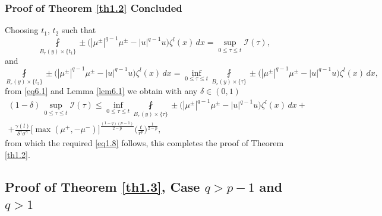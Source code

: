 \documentclass[a4paper,11pt,fullpage]{article}
\numberwithin{equation}{section}
\begin{document}
\subsubsection{Proof of Theorem \ref{th1.2} Concluded}
Choosing $t_1$, $t_2$ such that
$$\fint\limits_{B_{ r}(y)\times\{t_1\}}\pm\big(|\mu^{\pm}|^{q-1}\mu^{\pm}-|u|^{q-1}u\big)\zeta^l(x)\,dx=\sup\limits_{0\leqslant \tau\leqslant t}\mathcal{I}(\tau),$$
and
$$\fint\limits_{B_{r}(y)\times\{t_2\}}\pm\big(|\mu^{\pm}|^{q-1}\mu^{\pm}-|u|^{q-1}u\big)\zeta^l(x)\,dx=
\inf\limits_{0\leqslant \tau\leqslant t}\fint\limits_{B_{r}(y)\times\{\tau\}}\pm\big(|\mu^{\pm}|^{q-1}\mu^{\pm}-|u|^{q-1}u\big)\zeta^l(x)\,dx,$$
from \eqref{eq6.1} and Lemma \ref{lem6.1} we obtain with any $\delta \in (0, 1)$
\begin{multline*}
(1-\delta)\,\sup\limits_{0\leqslant \tau\leqslant t}\mathcal{I}(\tau)\leqslant \inf\limits_{0\leqslant \tau\leqslant t}\fint\limits_{B_{r}(y)\times\{\tau\}}\pm\big(|\mu^{\pm}|^{q-1}\mu^{\pm}-|u|^{q-1}u\big)\zeta^l(x)\,dx+\\+
\frac{\gamma(l)}{\delta^\gamma \sigma^\gamma}
\big[\max(\mu^+, -\mu^-)\big]^{\frac{(1-q)(p-1)}{2-p}}
\Big(\frac{t}{r^p}\Big)^{\frac{1}{2-p}},
\end{multline*}
from which  the required \eqref{eq1.8} follows, this completes the proof of Theorem \ref{th1.2}.


\subsection{Proof of Theorem \ref{th1.3}, Case $q>p-1$ and $q>1$}
\end{document}
